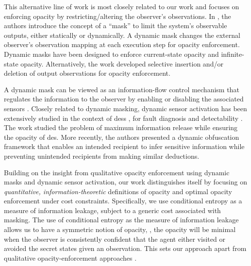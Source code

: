 This alternative line of work is most closely related to our work and focuses on enforcing opacity by restricting/altering the observer's observations. In  \cite{cassez2012synthesis}, the authors introduce the concept of a ``mask''   to limit the system's observable outputs, either statically or dynamically. A dynamic mask changes   the external observer's observation mapping at each execution step for opacity enforcement. Dynamic masks have been designed to enforce current-state opacity \cite{cassez2012synthesis}   and infinite-state opacity\cite{yin2019infinite}. Alternatively,  the work\cite{ji2018enforcement,ji2019opacity} developed  selective insertion and/or deletion of output observations for opacity enforcement. %

A dynamic mask can be viewed as an information-flow control mechanism that  regulates the information to the observer by   enabling or disabling the associated sensors \cite{yin2019synthesis}. Closely related to dynamic masking,  dynamic sensor activation has been extensively studied in the context of \ac{des}s \cite{sears2016minimal,yin2019general}, for  fault diagnosis \cite{cassez2008fault,thorsley2007active,wang2010minimization} and detectability \cite{shu2013online}. %
The work \cite{zhang2015maximum} studied the problem of maximum information release while ensuring the opacity of \ac{des}. More recently, the authors \cite{wintenberg2022dynamic} presented a dynamic obfuscation framework that enables an intended recipient to infer sensitive information while preventing unintended recipients from making similar deductions.  

Building on the insight from qualitative opacity enforcement using dynamic masks and dynamic sensor activation, our work distinguishes itself by focusing on \emph{quantitative, information-theoretic} definitions of opacity \cite{shi2024information} and optimal opacity enforcement under cost constraints. Specifically, we use conditional entropy as a measure of information leakage, subject to a generic cost associated with masking. The use of conditional entropy as the measure of information leakage allows us to have a symmetric notion of opacity, \ie, the opacity will be minimal when the observer is consistently confident that the agent either visited or avoided the secret states given an observation. 
This sets our approach apart from qualitative opacity-enforcement approaches \cite{cassez2012synthesis,yin2019general}. %

